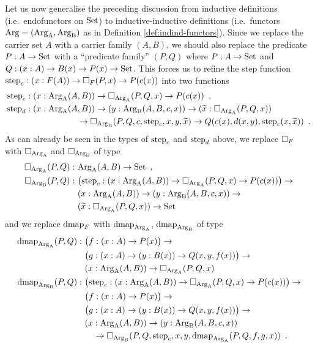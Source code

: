 \documentclass[orivec,envcountsame, ,envcountsect]{llncs}
\begin{document}
Let us now generalise the preceding discussion from inductive
definitions (i.e.\ endo\-functors on $\text{Set}$) to inductive-inductive
definitions (i.e.\ functors $\text{Arg} = (\text{Arg}_{\text{A}}, \text{Arg}_{\text{B}})$ as in Definition
\ref{def:indind-functors}). Since we replace the carrier set $A$ with
a carrier family $(A, B)$, we should also replace the predicate $P : A
\to \text{Set}$ with a ``predicate family'' $(P, Q)$ where $P : A \to \text{Set}$
and $Q : (x : A) \to B(x) \to P(x) \to \text{Set}$. This forces us to refine
the step function $\text{step}_{c} : (x : F(A)) \to \Box_F(P, x) \to P(c(x))$
into two functions
\begin{align*}
  \text{step}_{c} &: (x : \text{Arg}_{\text{A}}(A, B)) \to \Box_{\text{Arg}_{\text{A}}}(P, Q, x) \to P(c(x)) \enspace ,\\
  \text{step}_{d} &: (x : \text{Arg}_{\text{A}}(A, B)) \to (y : \text{Arg}_{\text{B}}(A, B, c, x)) \to
                   (\widetilde{x} : \Box_{\text{Arg}_{\text{A}}}(P, Q, x)) \\
              & \qquad\qquad\qquad \to \Box_{\text{Arg}_{\text{B}}}(P, Q, c, \text{step}_{c}, x, y, \widetilde{x}) \to Q(c(x), d(x, y), \text{step}_{c}(x, \widetilde{x})) \enspace .
\end{align*}
%
As can already be seen in the types of $\text{step}_{c}$ and $\text{step}_{d}$ above, we replace
$\Box_F$ with $\Box_{\text{Arg}_{\text{A}}}$ and $\Box_{\text{Arg}_{\text{B}}}$ of type
\begin{align*}
  \BOX_{\ArgA}(P, Q) :\ &\ArgA(A, B) \to \Set \enspace ,\\
%
  \BOX_{\ArgBpp}(P, Q) :\ %
                     &\big(\stepind{c} : (x : \ArgA(A, B)) \to \BOX_{\ArgA}(P, Q, x) \to P(c(x))\big) \to \\
                     &(x : \ArgA(A, B)) \to (y : \ArgBpp(A, B, c, x)) \to \\
                     & (\stepindarg{x} : \BOX_{\ArgA}(P, Q, x)) \to \Set
\end{align*} %
%
and we replace $\text{dmap}_F$ with $\text{dmap}_{\text{Arg}_{\text{A}}}$, $\text{dmap}_{\text{Arg}_{\text{B}}}$ of type
\begin{align*}
  \dmap_{\ArgA}(P, Q) :\ & \big(f : (x : A) \to P(x)\big) \to \\
                 & \big(g : (x : A) \to (y : B(x)) \to Q(x, y, f(x))\big) \to \\
                 & (x : \ArgA(A, B)) \to \BOX_{\ArgA}(P, Q, x) \\
%
  \dmap_{\ArgBpp}(P, Q) :\ &\big(\stepind{c} : (x : \ArgA(A, B)) \to \BOX_{\ArgA}(P, Q, x) \to P(c(x))\big) \to \\
                 & \big(f : (x : A) \to P(x)\big) \to \\
                 & \big(g : (x : A) \to (y : B(x)) \to Q(x, y, f(x))\big) \to \\
                 & (x : \ArgA(A, B)) \to (y : \ArgBpp(A, B, c, x)) \\ 
                 & \quad \to \BOX_{\ArgBpp}(P, Q, \stepind{c}, x, y, \dmap_{\ArgA}(P, Q, f, g, x)) \enspace .
\end{align*}
\end{document}
